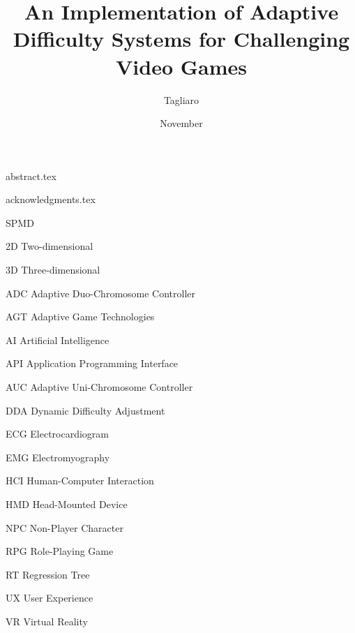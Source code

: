 \documentclass[cic,tc,english,nominata]{resources/documentclass/iiufrgs}
\title{An Implementation of Adaptive Difficulty Systems for Challenging Video Games}
\author{Tagliaro}{Leonardo Ramos Gonzalez}
\date{November}{2021} %
\begin{document}
\maketitle


{abstract.tex}


{acknowledgments.tex}


\listoffigures     %
\listoftables      %


\begin{listofabbrv}{SPMD}
    \item[2D] Two-dimensional
    \item[3D] Three-dimensional
    \item[ADC] Adaptive Duo-Chromosome Controller
	\item[AGT] Adaptive Game Technologies
	\item[AI] Artificial Intelligence
	\item[API] Application Programming Interface
	\item[AUC] Adaptive Uni-Chromosome Controller 
    \item[DDA] Dynamic Difficulty Adjustment
    \item[ECG] Electrocardiogram
    \item[EMG] Electromyography
    \item[HCI] Human-Computer Interaction
    \item[HMD] Head-Mounted Device
    \item[NPC] Non-Player Character
    \item[RPG] Role-Playing Game
    \item[RT] Regression Tree
    \item[UX] User Experience
    \item[VR] Virtual Reality
\end{listofabbrv}
\end{document}
